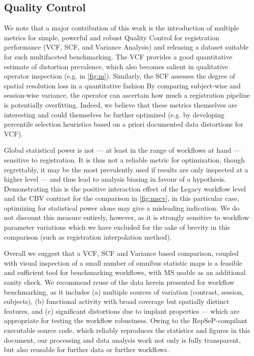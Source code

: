 \subsection{Quality Control}

We note that a major contribution of this work is the introduction of multiple metrics for simple, powerful and robust Quality Control for registration performance (VCF, SCF, and Variance Analysis) and releasing a dataset suitable for such multifaceted benchmarking.
The VCF provides a good quantitative estimate of distortion prevalence, which also becomes salient in qualitative operator inspection (e.g. in \cref{fig:m}).
Similarly, the SCF assesses the degree of spatial resolution loss in a quantitative fashion
By comparing subject-wise and session-wise variance, the operator can ascertain how much a registration pipeline is potentially overfitting.
Indeed, we believe that these metrics themselves are interesting and could themselves be further optimized (e.g. by developing percentile selection heuristics based on a priori documented data distortions for VCF).

Global statistical power is not --- at least in the range of workflows at hand --- sensitive to registration.
It is thus not a reliable metric for optimization, though regrettably, it may be the most prevalently used if results are only inspected at a higher level --- and thus lead to analysis biasing in favour of a hypothesis.
Demonstrating this is the positive interaction effect of the Legacy workflow level and the CBV contrast for the comparison in \cref{fig:mscv}, in this particular case, optimizing for statistical power alone may give a misleading indication.
We do not discount this measure entirely, however, as it is strongly sensitive to workflow parameter variations which we have excluded for the sake of brevity in this comparison (such as registration interpolation method).

Overall we suggest that a VCF, SCF and Variance based comparison, coupled with visual inspection of a small number of omnibus statistic maps is a feasible and sufficient tool for benchmarking workflows, with MS usable as an additional sanity check.
We recommend reuse of the data herein presented for workflow benchmarking, as it includes (a) multiple sources of variation (contrast, session, subjects), (b) functional activity with broad coverage but spatially distinct features, and (c) significant distortions due to implant properties --- which are appropriate for testing the workflow robustness.
Owing to the RepSeP-compilant executable source code, which reliably reproduces the statistics and figures in this document, our processing and data analysis work not only is fully transparent, but also reusable for further data or further workflows.

